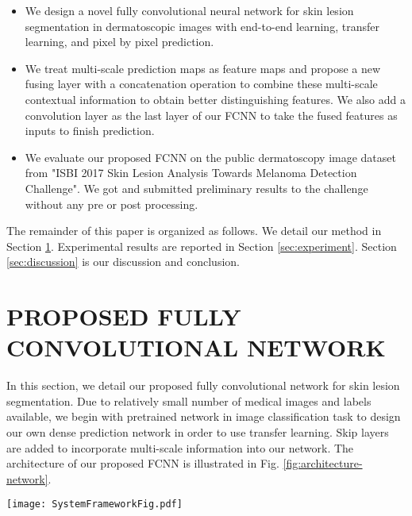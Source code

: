 \documentclass{article}
\begin{document}
\begin{itemize}
\item {We design a novel fully convolutional neural network for skin lesion segmentation in dermatoscopic images with end-to-end learning, transfer learning, and pixel by pixel prediction. }
\item{We treat multi-scale prediction maps as feature maps and propose a new fusing layer with a concatenation operation to combine these multi-scale contextual information to obtain better distinguishing features. We also add a convolution layer as the last layer of our FCNN to take the fused features as inputs to finish prediction.} 
\item{We evaluate our proposed FCNN on the public dermatoscopy image dataset from  
"ISBI 2017 Skin Lesion Analysis Towards Melanoma Detection Challenge"\cite{2017-ISBI-SkinLesionChallenge}.
 We got and submitted preliminary results to the challenge without any pre or post processing.} 
\end{itemize}       

The remainder of this paper is organized as follows. We detail our method in Section \ref{sec:method}. Experimental results are reported in Section \ref{sec:experiment}. Section \ref{sec:discussion} is our discussion and conclusion.


\section{PROPOSED FULLY CONVOLUTIONAL NETWORK}
\label{sec:method}

In this section, we detail our proposed fully convolutional network for skin lesion segmentation. Due to relatively small number of medical images and labels available, we begin with pretrained network in image classification task to design our own dense prediction network in order to use transfer learning. Skip layers are added to incorporate multi-scale information into our network.    
The architecture of our proposed FCNN is illustrated in Fig. \ref{fig:architecture-network}.
\begin{figure*}[htb]

\begin{minipage}[b]{1.0\linewidth}
  \centering
  \centerline{\texttt{[image: SystemFrameworkFig.pdf]}}
\end{minipage}
\caption{Architecture of our proposed FCNN. Blue vertical bar with solid contour: convolution layer; red vertical bar with dash contour: pooling layer; Blue small square: $1\times 1$ convolution layer; Blue horizontal bar: deconvolution layer for upsampling; Blue rectangular cube: fusing layer with concatenation operation.  Our FCNN learns to use multi-scale information.}
\label{fig:architecture-network}
\end{figure*}
\end{document}
